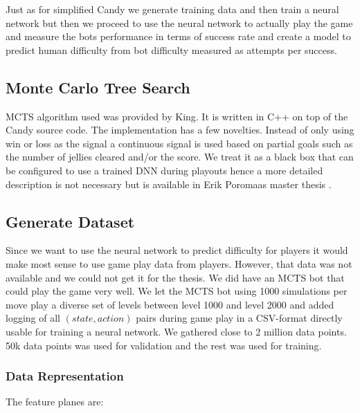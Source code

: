 \documentclass{kththesis}
\begin{document}
Just as for simplified Candy we generate training data and then train a neural network but then we proceed to use the neural network to actually play the game and measure the bots performance in terms of success rate and create a model to predict human difficulty from bot difficulty measured as attempts per success.

\subsection{Monte Carlo Tree Search}
MCTS algorithm used was provided by King. It is written in C++ on top of the Candy source code. The implementation has a few novelties. Instead of only using win or loss as the signal a  continuous signal is used based on partial goals such as the number of jellies cleared and/or the score.  We treat it as a black box that can be configured to use a trained DNN during playouts hence a more detailed description is not necessary but is available in Erik Poromaas master thesis \cite{poromaa2016}.

\subsection{Generate Dataset}
Since we want to use the neural network to predict difficulty for players it would make most sense to use game play data from players. However, that data was not available and we could not get it for the thesis. We did have an MCTS bot that could play the game very well. We let the MCTS bot using 1000 simulations per move play a diverse set of levels between level 1000 and level 2000 and added logging of all $(state, action)$ pairs  during game play in a CSV-format directly usable for training a neural network. We gathered close to 2 million data points. 50k data points was used for validation and the rest was used for training.

\subsubsection{Data Representation}
The feature planes are:
\end{document}

